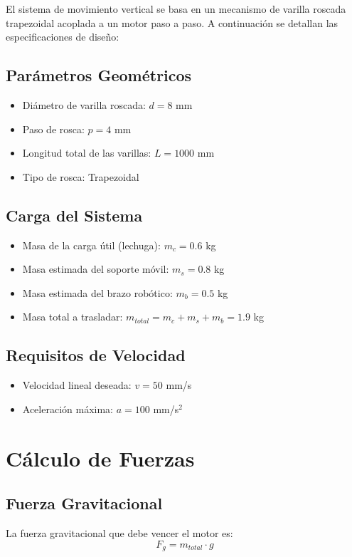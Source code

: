 
\label{sec:mov_vertical_prototipo}

El sistema de movimiento vertical se basa en un mecanismo de varilla roscada trapezoidal acoplada a un motor paso a paso. A continuación se detallan las especificaciones de diseño:

\subsection{Parámetros Geométricos}
\begin{itemize}
    \item Diámetro de varilla roscada: $d = 8$ mm
    \item Paso de rosca: $p = 4$ mm
    \item Longitud total de las varillas: $L = 1000$ mm
    \item Tipo de rosca: Trapezoidal
\end{itemize}

\subsection{Carga del Sistema}
\begin{itemize}
    \item Masa de la carga útil (lechuga): $m_c = 0.6$ kg
    \item Masa estimada del soporte móvil: $m_s = 0.8$ kg
    \item Masa estimada del brazo robótico: $m_b = 0.5$ kg
    \item Masa total a trasladar: $m_{total} = m_c + m_s + m_b = 1.9$ kg
\end{itemize}

\subsection{Requisitos de Velocidad}
\begin{itemize}
    \item Velocidad lineal deseada: $v = 50$ mm/s
    \item Aceleración máxima: $a = 100$ mm/s$^2$
\end{itemize}

\section{Cálculo de Fuerzas}

\subsection{Fuerza Gravitacional}
La fuerza gravitacional que debe vencer el motor es:
\begin{equation}
F_g = m_{total} \cdot g
\end{equation}

